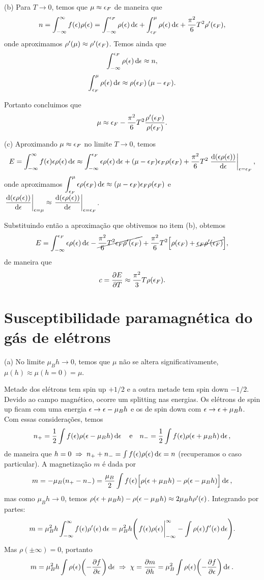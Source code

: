 \documentclass[a4paper,10pt]{article}
\begin{document}
(b) Para $T \to 0$, temos que $\mu \approx \epsilon_F$ de maneira que
$$
n = \int_{-\infty}^{\infty} f(\epsilon) \rho(\epsilon) =
\int_{-\infty}^{\epsilon_F} \rho(\epsilon) \dd{\epsilon} +
\int_{\epsilon_F}^{\mu} \rho(\epsilon) \dd{\epsilon} +
\frac{\pi^2}{6} T^2 \rho'(\epsilon_F),
$$
onde aproximamos $\rho'(\mu) \approx \rho'(\epsilon_F)$. Temos ainda que
$$
\int_{-\infty}^{\epsilon_F} \rho(\epsilon) \dd{\epsilon} \approx n,
$$
$$
\int_{\epsilon_F}^{\mu} \rho(\epsilon) \dd{\epsilon} \approx \rho(\epsilon_F) \, (\mu - \epsilon_F).
$$

Portanto concluimos que
$$
\mu \approx \epsilon_F - \frac{\pi^2}{6} T^2 \frac{\rho'(\epsilon_F)}{\rho(\epsilon_F)}.
$$

(c) Aproximando $\mu \approx \epsilon_F$ no limite $T \to 0$, temos
$$
E = \int_{-\infty}^{\infty} f(\eps) \eps \rho(\eps) \dd{\eps} \approx
\int_{-\infty}^{\eps_F} \eps \rho(\eps) \dd{\eps} +
(\mu - \eps_F) \eps_F \rho(\eps_F) +
\frac{\pi^2}{6} T^2 \eval{\dv{(\eps \rho(\eps))}{\eps}}_{\eps = \eps_F},
$$
onde aproximamos $\displaystyle{\int_{\epsilon_F}^{\mu} \epsilon\rho(\epsilon_F) \dd{\epsilon} \approx (\mu - \epsilon_F) \epsilon_F \rho(\epsilon_F)}$ e $\displaystyle{\eval{\dv{(\eps \rho(\eps))}{\eps}}_{\eps = \mu} \approx \eval{\dv{(\eps \rho(\eps))}{\eps}}_{\eps = \eps_F}}$.

\n

Substituindo então a aproximação que obtivemos no item (b), obtemos
$$
E = \int_{-\infty}^{\epsilon_F} \epsilon \rho(\epsilon) \dd{\epsilon}
- \cancel{ \frac{\pi^2}{6} T^2 \epsilon_F \rho'(\epsilon_F) } +
\frac{\pi^2}{6} T^2 \Big[\rho(\epsilon_F) + \cancel{ \epsilon_F \rho'(\epsilon_F) } \Big],
$$
de maneira que
$$
c = \pdv{E}{T} \approx \frac{\pi^2}{3} T \rho(\epsilon_F).
$$


\pagebreak

\section{Susceptibilidade paramagnética do gás de elétrons}

(a) No limite $\mu_B h \to 0$, temos que $\mu$ não se altera significativamente, $\mu(h) \approx \mu(h = 0) = \mu$.

Metade dos elétrons tem spin up $+1/2$ e a outra metade tem spin down $-1/2$. Devido ao campo magnético, ocorre um splitting nas energias. Os elétrons de spin up ficam com uma energia $\epsilon \to \epsilon - \mu_B h$ e os de spin down com $\epsilon \to \epsilon + \mu_B h$. Com essas considerações, temos
$$
n_+ = \frac{1}{2} \int f(\epsilon) \rho(\epsilon - \mu_B h) \dd{\epsilon} \quad \mathrm{e} \quad
n_- = \frac{1}{2} \int f(\epsilon) \rho(\epsilon + \mu_B h) \dd{\epsilon},
$$
de maneira que $h = 0 \; \Rightarrow \; n_+ + n_- = \int f(\epsilon) \rho(\epsilon) \dd{\epsilon} = n$ (recuperamos o caso particular). A magnetização $m$ é dada por
$$
m = - \mu_B (n_+ - n_-) =
\frac{\mu_B}{2} \int f(\epsilon) \Big[ \rho(\epsilon + \mu_B h) - \rho(\epsilon - \mu_B h) \Big] \dd{\epsilon},
$$
mas como $\mu_B h \to 0$, temos $\rho(\epsilon + \mu_B h) - \rho(\epsilon - \mu_B h) \approx 2 \mu_B h \rho'(\epsilon)$. Integrando por partes:
$$
m = \mu_B^2 h \int_{-\infty}^{\infty} f(\eps) \rho'(\eps) \dd{\eps} =
\mu_B^2 h \qty(\eval{f(\eps) \rho(\eps)}_{-\infty}^{\infty} - \int \rho(\eps) f'(\eps) \dd{\eps} ).
$$
Mas $\rho(\pm\infty) = 0$, portanto
$$
m = \mu_B^2 h \int \rho(\epsilon) \qty(- \pdv{f}{\epsilon}) \dd{\epsilon} \; \Rightarrow \;
\chi = \pdv{m}{h} = \mu_B^2 \int \rho(\epsilon) \qty(- \pdv{f}{\epsilon}) \dd{\epsilon}.
$$
\end{document}

